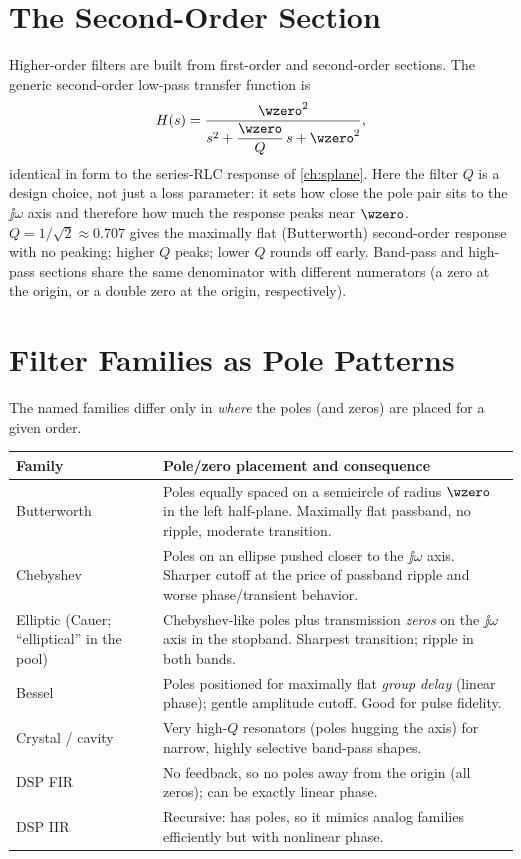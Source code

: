 \section{The Second-Order Section}
Higher-order filters are built from first-order and second-order sections. The
generic second-order low-pass transfer function is
\[
H(s)=\frac{\wzero^2}{s^2+\dfrac{\wzero}{Q}\,s+\wzero^2},
\]
identical in form to the series-RLC response of \cref{ch:splane}. Here the filter
\(Q\) is a design choice, not just a loss parameter: it sets how close the pole
pair sits to the \(\jj\omega\) axis and therefore how much the response peaks near
\(\wzero\). \(Q=1/\sqrt{2}\approx0.707\) gives the maximally flat (Butterworth)
second-order response with no peaking; higher \(Q\) peaks; lower \(Q\) rounds off
early. Band-pass and high-pass sections share the same denominator with different
numerators (a zero at the origin, or a double zero at the origin, respectively).

\section{Filter Families as Pole Patterns}
The named families differ only in \emph{where} the poles (and zeros) are placed
for a given order.

\begin{tabularx}{\textwidth}{@{}L{0.19\textwidth}Y@{}}
\toprule
Family & Pole/zero placement and consequence \\
\midrule
Butterworth & Poles equally spaced on a semicircle of radius \(\wzero\) in the left half-plane. Maximally flat passband, no ripple, moderate transition. \\
Chebyshev & Poles on an ellipse pushed closer to the \(\jj\omega\) axis. Sharper cutoff at the price of passband ripple and worse phase/transient behavior. \\
Elliptic (Cauer; ``elliptical'' in the pool) & Chebyshev-like poles plus transmission \emph{zeros} on the \(\jj\omega\) axis in the stopband. Sharpest transition; ripple in both bands. \\
Bessel & Poles positioned for maximally flat \emph{group delay} (linear phase); gentle amplitude cutoff. Good for pulse fidelity. \\
Crystal / cavity & Very high-\(Q\) resonators (poles hugging the axis) for narrow, highly selective band-pass shapes. \\
DSP FIR & No feedback, so no poles away from the origin (all zeros); can be exactly linear phase. \\
DSP IIR & Recursive: has poles, so it mimics analog families efficiently but with nonlinear phase. \\
\bottomrule
\end{tabularx}

